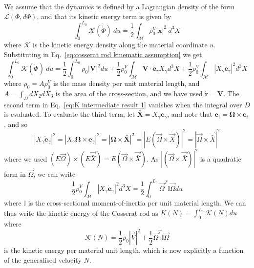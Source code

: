 We assume that the dynamics is defined by a Lagrangian density of the form $\mathcal{L}(\Phi, d \Phi)$, and that its kinetic energy term is given by
\begin{equation} \label{eq:lagrangian of tube}
\int_0^{L_0} \mathcal{K}(\dot{\Phi})\ du = \frac{1}{2} \int_\mathcal{M} \rho^{V}_0 | \dot{\mathbf{x}} |^2\ d^3 X
\end{equation} 
where $\mathcal{K}$ is the kinetic energy density along the material coordinate $u$. Substituting in Eq.~\ref{eq:cosserat rod kinematic assumption} we get
\begin{equation} \label{eq:K intermediate result 1}
\int_0^{L_0} \mathcal{K}(\dot{\Phi})\ du = \frac{1}{2} \int_0^{L_0} \rho_0 |\mathbf{V}|^2 du + \frac{1}{2} \rho_0^V \int_\mathcal{M} \mathbf{V} \cdot \dot{\mathbf{e}}_\gamma X_\gamma d^3 X  + \frac{1}{2} \rho_0^V \int_\mathcal{M} |X_\gamma \dot{\mathbf{e}}_\gamma|^2 d^3 X
\end{equation} 
where $\rho_0 = A \rho^{V}_0$ is the mass density per unit material length, and $A = \int_D d X_2 dX_3$ is the area of the cross-section, and we have used $\dot{\mathbf{r}} = \mathbf{V}$. The second term in Eq.~\ref{eq:K intermediate result 1} vanishes when the integral over $D$ is evaluated. To evaluate the third term, let $\bar{\mathbf{X}} = X_\gamma \mathbf{e}_\gamma$, and note that $\mathbf{e}_i = \boldsymbol{\Omega} \times \mathbf{e}_i$, and so
\begin{equation}
|X_\gamma \dot{\mathbf{e}}_\gamma|^2 = |X_\gamma \boldsymbol{\Omega} \times \mathbf{e}_\gamma|^2 = |\boldsymbol{\Omega} \times \bar{\mathbf{X}}|^2 = |E (\vec{\Omega} \times \bar{\vec{X}})|^2 = |\vec{\Omega} \times \vec{\bar{X}}|^2
\end{equation}
where we used $(E\vec{\Omega}) \times (E\vec{\bar{X}}) = E (\vec{\Omega} \times \vec{\bar{X}})$. As $|(\vec{\Omega} \times \vec{\bar{X}})|^2$ is a quadratic form in $\vec{\Omega}$, we can write
\begin{equation}
\frac{1}{2} \rho_0^V \int_\mathcal{M} |X_\gamma \dot{\mathbf{e}}_\gamma|^2 d^3 X = \frac{1}{2} \int_0^{L_0} \vec{\Omega}^T \mathbb{I} \vec{\Omega} du
\end{equation}
where $\mathbb{I}$ is the cross-sectional moment-of-inertia per unit material length. We can thus write the kinetic energy of the Cosserat rod as $K(N) = \int_0^{L_0} \mathcal{K}(N) du$ where 
\begin{equation} \label{eq:reduced kinetic energy}
\mathcal{K}(N)  = \frac{1}{2} \rho_0 |\vec{V}|^2 +  \frac{1}{2} \vec{\Omega}^T \mathbb{I} \vec{\Omega}
\end{equation}
is the kinetic energy per material unit length, which is now explicitly a function of the generalised velocity $N$.

